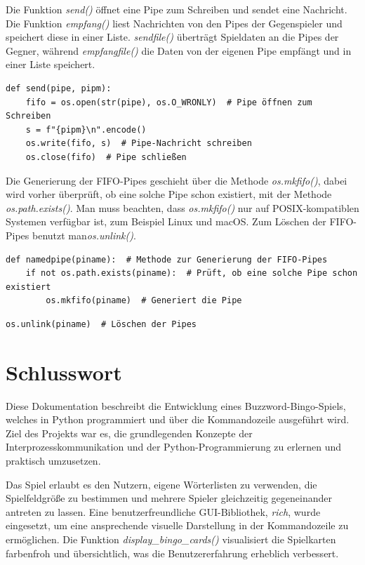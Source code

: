 \documentclass{llncs}
\begin{document}
Die Funktion \textit{send()} öffnet eine Pipe zum Schreiben und sendet eine Nachricht. Die Funktion \textit{empfang()} liest Nachrichten von den Pipes der Gegenspieler und speichert diese in einer Liste. \textit{sendfile()} überträgt Spieldaten an die Pipes der Gegner, während \textit{empfangfile()} die Daten von der eigenen Pipe empfängt und in einer Liste speichert.

\begin{lstlisting}[caption=Nachricht an Pipe senden]
def send(pipe, pipm):
    fifo = os.open(str(pipe), os.O_WRONLY)  # Pipe öffnen zum Schreiben
    s = f"{pipm}\n".encode()
    os.write(fifo, s)  # Pipe-Nachricht schreiben
    os.close(fifo)  # Pipe schließen
\end{lstlisting}


Die Generierung der FIFO-Pipes geschieht über die Methode  \textit{os.mkfifo()}, dabei wird vorher überprüft, ob eine solche Pipe schon existiert, mit der Methode  \textit{os.path.exists()}. 
Man muss beachten, dass  \textit{os.mkfifo()} nur auf POSIX-kompatiblen Systemen verfügbar ist, zum Beispiel Linux und macOS.
Zum Löschen der FIFO-Pipes benutzt man\textit{os.unlink()}.

\begin{lstlisting}[caption=FIFO-Pipe Erstellen]
def namedpipe(piname):  # Methode zur Generierung der FIFO-Pipes
    if not os.path.exists(piname):  # Prüft, ob eine solche Pipe schon existiert
        os.mkfifo(piname)  # Generiert die Pipe
\end{lstlisting}


\begin{lstlisting}[caption=FIFO-Pipe Entfernen]
  os.unlink(piname)  # Löschen der Pipes
\end{lstlisting}

\section{Schlusswort}

Diese Dokumentation beschreibt die Entwicklung eines Buzzword-Bingo-Spiels, welches in Python programmiert und über die Kommandozeile ausgeführt wird. Ziel des Projekts war es, die grundlegenden Konzepte der Interprozesskommunikation und der Python-Programmierung zu erlernen und praktisch umzusetzen.

Das Spiel erlaubt es den Nutzern, eigene Wörterlisten zu verwenden, die Spielfeldgröße zu bestimmen und mehrere Spieler gleichzeitig gegeneinander antreten zu lassen. Eine benutzerfreundliche GUI-Bibliothek, \textit{rich}, wurde eingesetzt, um eine ansprechende visuelle Darstellung in der Kommandozeile zu ermöglichen. Die Funktion \textit{display\_bingo\_cards()} visualisiert die Spielkarten farbenfroh und übersichtlich, was die Benutzererfahrung erheblich verbessert.
\end{document}
